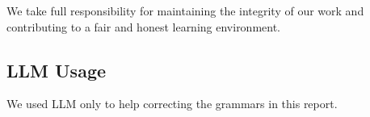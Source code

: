 \documentclass[10pt,letterpaper]{article}
\begin{document}
We take full responsibility for maintaining the integrity of our work and contributing to a fair and honest learning environment.
\subsection{LLM Usage}
We used LLM only to help correcting the grammars in this report.


\end{document}
